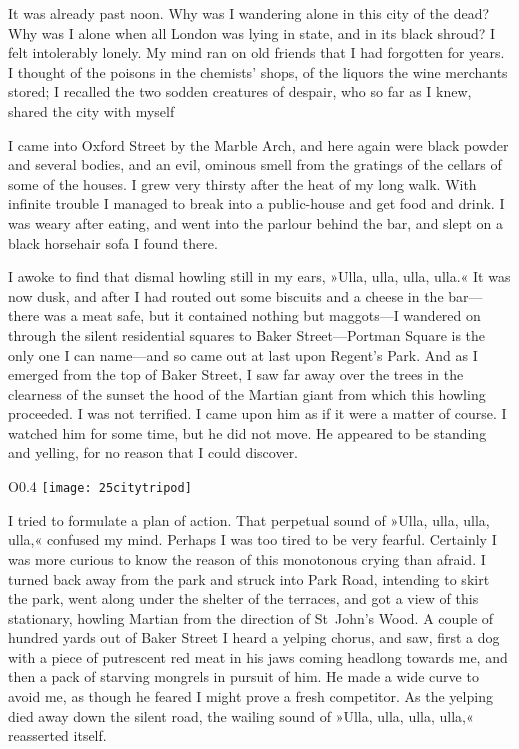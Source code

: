 It was already past noon. Why was I wandering alone in this city of the dead? Why was I alone when all London was lying in state, and in its black shroud? I felt intolerably lonely. My mind ran on old friends that I had forgotten for years. I thought of the poisons in the chemists' shops, of the liquors the wine merchants stored; I recalled the two sodden creatures of despair, who so far as I knew, shared the city with myself\textellipsis

I came into Oxford Street by the Marble Arch, and here again were black powder and several bodies, and an evil, ominous smell from the gratings of the cellars of some of the houses. I grew very thirsty after the heat of my long walk. With infinite trouble I managed to break into a public-house and get food and drink. I was weary after eating, and went into the parlour behind the bar, and slept on a black horsehair sofa I found there.

I awoke to find that dismal howling still in my ears, »Ulla, ulla, ulla, ulla.« It was now dusk, and after I had routed out some biscuits and a cheese in the bar—there was a meat safe, but it contained nothing but maggots—I wandered on through the silent residential squares to Baker Street—Portman Square is the only one I can name—and so came out at last upon Regent's Park. And as I emerged from the top of Baker Street, I saw far away over the trees in the clearness of the sunset the hood of the Martian giant from which this howling proceeded. I was not terrified. I came upon him as if it were a matter of course. I watched him for some time, but he did not move. He appeared to be standing and yelling, for no reason that I could discover.

\begin{wrapfigure}{O}{0.4\textwidth}
\centering
\texttt{[image: 25citytripod]}
\end{wrapfigure}

I tried to formulate a plan of action. That perpetual sound of »Ulla, ulla, ulla, ulla,« confused my mind. Perhaps I was too tired to be very fearful. Certainly I was more curious to know the reason of this monotonous crying than afraid. I turned back away from the park and struck into Park Road, intending to skirt the park, went along under the shelter of the terraces, and got a view of this stationary, howling Martian from the direction of St~John's Wood. A couple of hundred yards out of Baker Street I heard a yelping chorus, and saw, first a dog with a piece of putrescent red meat in his jaws coming headlong towards me, and then a pack of starving mongrels in pursuit of him. He made a wide curve to avoid me, as though he feared I might prove a fresh competitor. As the yelping died away down the silent road, the wailing sound of »Ulla, ulla, ulla, ulla,« reasserted itself.

